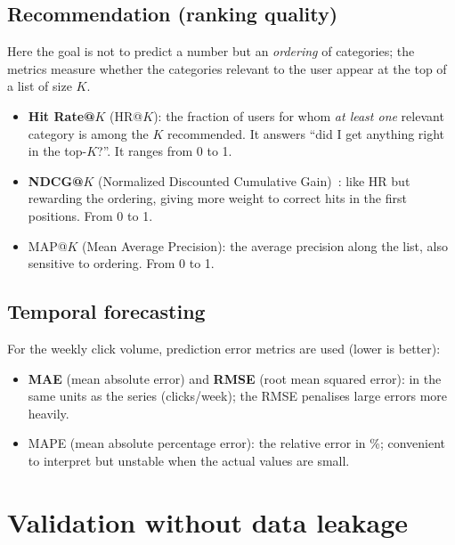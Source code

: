 \subsection{Recommendation (ranking quality)}

Here the goal is not to predict a number but an \emph{ordering} of categories; the metrics measure whether the categories relevant to the user appear at the top of a list of size $K$.
\begin{itemize}
    \item \textbf{Hit Rate@$K$} (HR@$K$): the fraction of users for whom \emph{at least one} relevant category is among the $K$ recommended. It answers ``did I get anything right in the top-$K$?''. It ranges from 0 to 1.
    \item \textbf{NDCG@$K$} (Normalized Discounted Cumulative Gain)~\cite{jarvelin2002}: like HR but rewarding the ordering, giving more weight to correct hits in the first positions. From 0 to 1.
    \item MAP@$K$ (Mean Average Precision): the average precision along the list, also sensitive to ordering. From 0 to 1.
\end{itemize}

\subsection{Temporal forecasting}

For the weekly click volume, prediction error metrics are used (lower is better):
\begin{itemize}
    \item \textbf{MAE} (mean absolute error) and \textbf{RMSE} (root mean squared error): in the same units as the series (clicks/week); the RMSE penalises large errors more heavily.
    \item MAPE (mean absolute percentage error): the relative error in \%; convenient to interpret but unstable when the actual values are small.
\end{itemize}

\section{Validation without data leakage}
\label{sec:validacion}

